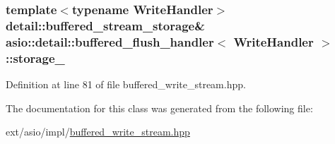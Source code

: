 \subsubsection[{storage\+\_\+}]{\setlength{\rightskip}{0pt plus 5cm}template$<$typename Write\+Handler$>$ {\bf detail\+::buffered\+\_\+stream\+\_\+storage}\& {\bf asio\+::detail\+::buffered\+\_\+flush\+\_\+handler}$<$ Write\+Handler $>$\+::storage\+\_\+}\label{classasio_1_1detail_1_1buffered__flush__handler_af3c17bfdba4ed3f2ce790665ef49faf1}


Definition at line 81 of file buffered\+\_\+write\+\_\+stream.\+hpp.



The documentation for this class was generated from the following file\+:\begin{DoxyCompactItemize}
\item 
ext/asio/impl/\hyperlink{impl_2buffered__write__stream_8hpp}{buffered\+\_\+write\+\_\+stream.\+hpp}\end{DoxyCompactItemize}
